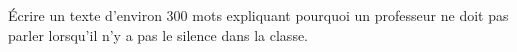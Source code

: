 
\begin{exercice}\label{exosmath-0423}

Écrire un texte d'environ 300 mots expliquant pourquoi un professeur ne doit pas parler lorsqu'il n'y a pas le silence dans la classe.

\end{exercice}
